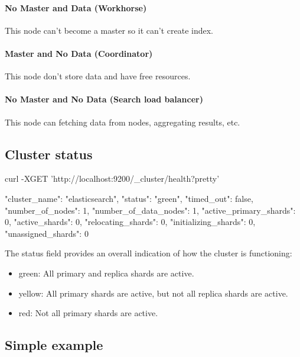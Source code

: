 \documentclass{article}%
\begin{document}
\paragraph{No Master and Data (Workhorse)} This node can't become a master so it can't create index.

\paragraph{Master and No Data (Coordinator)} This node don't store data and have free resources.

\paragraph{No Master and No Data (Search load balancer)} This node can fetching data from nodes, aggregating results, etc.

\subsection{Cluster status}

\begin{command}
curl -XGET 'http://localhost:9200/_cluster/health?pretty'
\end{command}

\begin{command}
{
	"cluster_name":          "elasticsearch",
	"status":                "green", 
	"timed_out":             false,
	"number_of_nodes":       1,
	"number_of_data_nodes":  1,
	"active_primary_shards": 0,
	"active_shards":         0,
	"relocating_shards":     0,
	"initializing_shards":   0,
	"unassigned_shards":     0
}
\end{command}

The status field provides an overall indication of how the cluster is functioning:

\begin{itemize}
	\item green: All primary and replica shards are active.
	\item yellow: All primary shards are active, but not all replica shards are active.
	\item red: Not all primary shards are active.
\end{itemize}

\subsection{Simple example}
\end{document}
